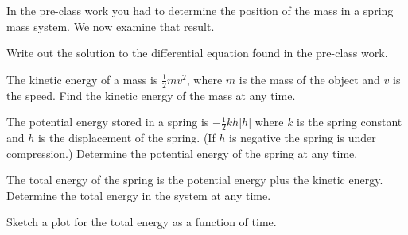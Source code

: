   \begin{problem}
  \item In the pre-class work you had to determine the position of the
    mass in a spring mass system. We now examine that result.
    \begin{subproblem}
    \item Write out the solution to the differential equation found in
      the pre-class work.
      \vspace{2em}
    \item The kinetic energy of a mass is $\frac{1}{2} m v^2$, where
      $m$ is the mass of the object and $v$ is the speed. Find the
      kinetic energy of the mass at any time.
      \vfill

    \clearpage

  \item The potential energy stored in a spring is $-\frac{1}{2} k h |h|$
    where $k$ is the spring constant and $h$ is the displacement of
    the spring. (If $h$ is negative the spring is under compression.)
    Determine the potential energy of the spring at any time.
    \vfill

    \clearpage
  \item The total energy of the spring is the potential energy plus
    the kinetic energy. Determine the total energy in the system at
    any time. 

    \vfill

  \item Sketch a plot for the total energy as a function of time.
    \vspace*{8em}


  \end{subproblem}



\end{problem}

